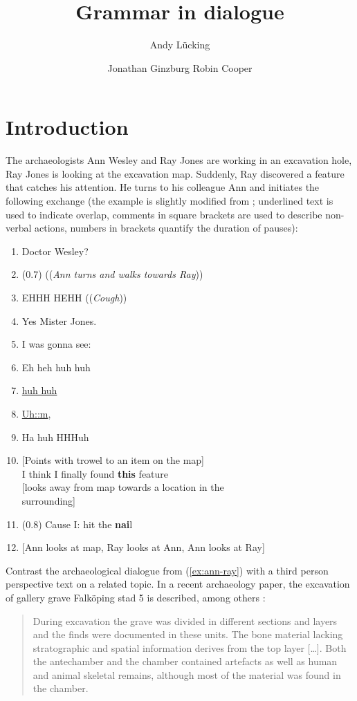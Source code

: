 \documentclass[output=paper]{langsci/langscibook}
\author{%
	Andy Lücking\affiliation{Goethe-Universität Frankfurt}%
	\and Jonathan Ginzburg\affiliation{Université de Paris}%
	\lastand Robin Cooper\affiliation{G\"{o}teborgs Universitet}%
}
\title{Grammar in dialogue}
\begin{document}
\label{chap-pragmatics}

{
\avmoptions{}


\section{Introduction} 
\label{sec:introduction}

The archaeologists Ann Wesley and Ray Jones are working in an excavation hole, Ray Jones is looking at the excavation map.
%
Suddenly, Ray discovered a feature that catches his attention. %
He turns to his colleague Ann and initiates the following exchange (the example is slightly modified from \citet[]{Goodwin:2003}; underlined text is used to indicate overlap, comments in square brackets are used to describe non-verbal actions, numbers in brackets quantify the duration of pauses):
%
\ea \label{ex:ann-ray}
\begin{enumerate}[noitemsep]
    \item {} Doctor Wesley?
    \item \speaking{} \quad (0.7) ((\textit{Ann turns and walks towards Ray}))
    \item {} EHHH HEHH ((\textit{Cough}))
    \item \speaking{} Yes Mister Jones.
    \item {} I was gonna see:
    \item {} \textdegree Eh heh huh huh
    \item \speaking{}  \underline{huh huh}
    \item {}  \underline{Uh::m},
    \item {} Ha huh HHHuh
    \item {} [Points with trowel to an item on the map] \\ 
    \speaking{} I think I finally found \textbf{this} feature \\
    \speaking{} [looks away from map towards a location in the\\ \speaking{} surrounding]
    \item \speaking{} (0.8) Cause I: hit the \textbf{nai}l
    \item { [Ann looks at map, Ray looks at Ann, Ann looks at Ray] }
\end{enumerate}
\z


Contrast the archaeological dialogue from (\ref{ex:ann-ray}) with a third person perspective text on a related topic.
%
In a recent archaeology paper, the excavation of gallery grave Falk\"{o}ping stad 5 is described, among others \citep[]{Blank:Tornberg:Knipper:2018}:
%
\begin{quote}
During excavation the grave was divided in different sections and layers and the finds were documented in these units. The bone material lacking stratographic and spatial information derives from the top layer [\ldots]. Both the antechamber and the chamber contained artefacts as well as human and animal skeletal remains, although most of the material was found in the chamber.
\end{quote}


}
\end{document}
